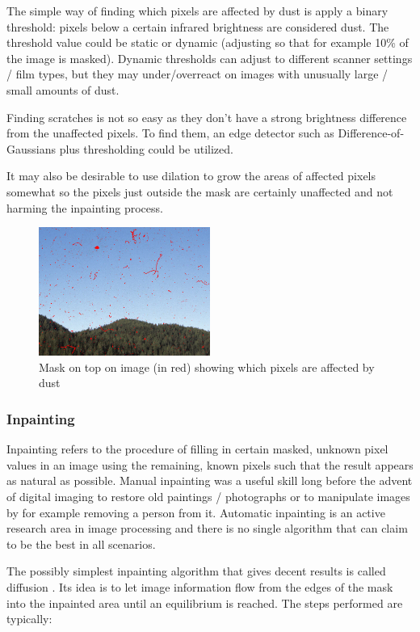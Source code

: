 \documentclass{article}
\begin{document}
The simple way of finding which pixels are affected by dust is apply a binary
threshold: pixels below a certain infrared brightness are considered
dust. The threshold value could be static or dynamic (adjusting so that for example 10\% of
the image is masked). Dynamic thresholds can adjust to different scanner settings /
film types, but they may under/overreact on images with unusually large / small amounts
of dust.

Finding scratches is not so easy as they don't have a strong brightness difference
from the unaffected pixels. To find them, an edge detector such as Difference-of-Gaussians
plus thresholding could be utilized.

It may also be desirable to use dilation to grow the areas of affected pixels somewhat
so the pixels just outside the mask are certainly unaffected and not harming the inpainting process.

\begin{figure}[H]
  \caption{Mask on top on image (in red) showing which pixels are affected by dust}
  \centering
  \includegraphics[width=0.5\textwidth]{images/inpaint_3.jpg}
\end{figure}

\subsubsection{Inpainting}

Inpainting refers to the procedure of filling in certain masked, unknown
pixel values in an image using the remaining, known pixels such that the
result appears as natural as possible. Manual inpainting was a useful skill long before
the advent of digital imaging to restore old paintings / photographs or
to manipulate images by for example removing a person from it. Automatic inpainting
is an active research area in image processing and there is no single algorithm
that can claim to be the best in all scenarios. \cite{inpainting_survey}

The possibly simplest inpainting algorithm that gives decent results is called
diffusion \cite{inpainting_diffusion}. Its idea is to let image information flow from the edges of the mask
into the inpainted area until an equilibrium is reached. The steps performed are
typically:
\end{document}
